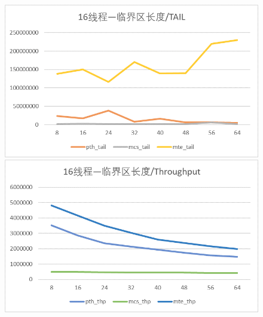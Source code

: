 \documentclass[UTF8]{ctexart}
\begin{document}
\begin{enumerate}
    \begin{figure}[!h]
        \centering
        \begin{minipage}{0.49\linewidth}
            \centering
            \includegraphics[scale=0.64]{../images/5.png}
        \end{minipage}
        \begin{minipage}{0.49\linewidth}
            \centering
            \includegraphics[scale=0.64]{../images/6.png}
        \end{minipage}
    \end{figure}


\end{enumerate}
\end{document}
